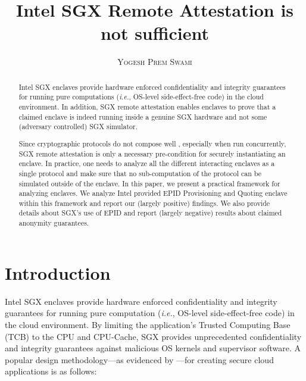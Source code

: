 \documentclass[10pt, letterpaper]{article}
\title{\bf Intel SGX Remote Attestation is not sufficient}
\author{\textsc{Yogesh Prem Swami}}
\date{\lastupdate}
\newcommand{\ie}{\textit{i.e.}}
\begin{document}

\maketitle

\begin{abstract}
  Intel SGX enclaves provide hardware enforced confidentiality and
  integrity guarantees for running pure computations (\ie, OS-level
  side-effect-free code) in the cloud environment. In addition, SGX
  remote attestation enables enclaves to prove that a claimed enclave
  is indeed running inside a genuine SGX hardware and not some
  (adversary controlled) SGX simulator.

  Since cryptographic protocols do not compose well
  \cite{cramerthesis,ucframework,gnuc}, especially when run
  concurrently, SGX remote attestation is only a necessary
  pre-condition for securely instantiating an enclave. In practice,
  one needs to analyze all the different interacting enclaves as a
  single protocol and make sure that no sub-computation of the
  protocol can be simulated outside of the enclave. In this paper, we
  present a practical framework for analyzing enclaves. We analyze
  Intel provided EPID \cite{epid} \textsf{Provisioning} and
  \textsf{Quoting} enclave \cite{sgxattest} within this framework and
  report our (largely positive) findings. We also provide details
  about SGX's use of EPID and report (largely negative) results about
  claimed anonymity guarantees.

\end{abstract}

\section{Introduction}
\label{sec:intro}
  Intel SGX enclaves\cite{sgxinnov, sgxinnov2} provide hardware
  enforced confidentiality and integrity guarantees for running pure
  computation (\textit{i.e.}, OS-level side-effect-free code) in the
  cloud environment. By limiting the application's Trusted Computing
  Base (TCB) to the CPU and CPU-Cache, SGX provides unprecedented
  confidentiality and integrity guarantees against malicious OS
  kernels and supervisor software. A popular design methodology---as
  evidenced by \cite{Haven, Graphene, Scone}---for creating secure
  cloud applications is as follows:
\end{document}
